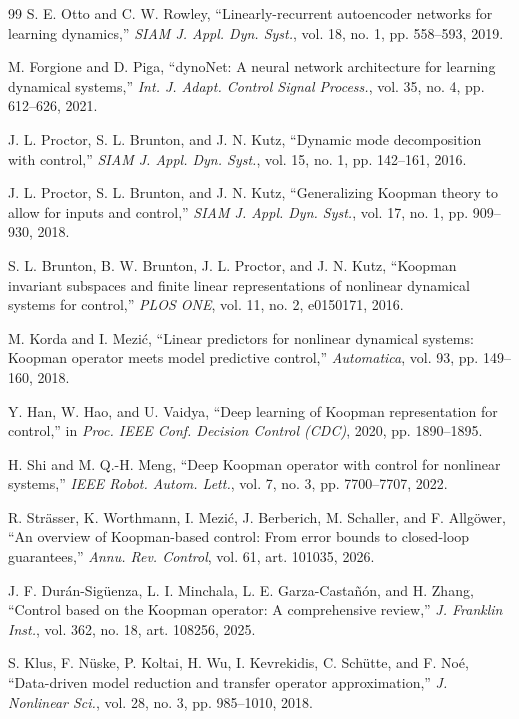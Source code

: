 \documentclass[journal]{IEEEtran}
\begin{document}
\begin{thebibliography}{99}
S. E. Otto and C. W. Rowley, ``Linearly-recurrent autoencoder networks for learning dynamics,'' \emph{SIAM J. Appl. Dyn. Syst.}, vol. 18, no. 1, pp. 558--593, 2019.

M. Forgione and D. Piga, ``dynoNet: A neural network architecture for learning dynamical systems,'' \emph{Int. J. Adapt. Control Signal Process.}, vol. 35, no. 4, pp. 612--626, 2021.

J. L. Proctor, S. L. Brunton, and J. N. Kutz, ``Dynamic mode decomposition with control,'' \emph{SIAM J. Appl. Dyn. Syst.}, vol. 15, no. 1, pp. 142--161, 2016.

J. L. Proctor, S. L. Brunton, and J. N. Kutz, ``Generalizing Koopman theory to allow for inputs and control,'' \emph{SIAM J. Appl. Dyn. Syst.}, vol. 17, no. 1, pp. 909--930, 2018.

S. L. Brunton, B. W. Brunton, J. L. Proctor, and J. N. Kutz, ``Koopman invariant subspaces and finite linear representations of nonlinear dynamical systems for control,'' \emph{PLOS ONE}, vol. 11, no. 2, e0150171, 2016.

M. Korda and I. Mezi\'c, ``Linear predictors for nonlinear dynamical systems: Koopman operator meets model predictive control,'' \emph{Automatica}, vol. 93, pp. 149--160, 2018.

Y. Han, W. Hao, and U. Vaidya, ``Deep learning of Koopman representation for control,'' in \emph{Proc. IEEE Conf. Decision Control (CDC)}, 2020, pp. 1890--1895.

H. Shi and M. Q.-H. Meng, ``Deep Koopman operator with control for nonlinear systems,'' \emph{IEEE Robot. Autom. Lett.}, vol. 7, no. 3, pp. 7700--7707, 2022.

R. Str\"asser, K. Worthmann, I. Mezi\'c, J. Berberich, M. Schaller, and F. Allg\"ower, ``An overview of Koopman-based control: From error bounds to closed-loop guarantees,'' \emph{Annu. Rev. Control}, vol. 61, art. 101035, 2026.

J. F. Dur\'an-Sig\"uenza, L. I. Minchala, L. E. Garza-Casta\~n\'on, and H. Zhang, ``Control based on the Koopman operator: A comprehensive review,'' \emph{J. Franklin Inst.}, vol. 362, no. 18, art. 108256, 2025.

S. Klus, F. N\"uske, P. Koltai, H. Wu, I. Kevrekidis, C. Sch\"utte, and F. No\'e, ``Data-driven model reduction and transfer operator approximation,'' \emph{J. Nonlinear Sci.}, vol. 28, no. 3, pp. 985--1010, 2018.


\end{thebibliography}
\end{document}
